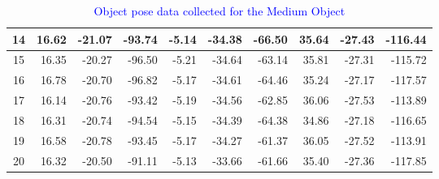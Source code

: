 \begin{table}[]
{\begin{tabular}{|c|r|r|r|r|r|r|r|r|r|}
14      & 16.62                       & -21.07                      & -93.74                                 & -5.14                       & -34.38                      & -66.50                                  & 35.64                       & -27.43                      & -116.44                                \\ \hline
15      & 16.35                       & -20.27                      & -96.50                                  & -5.21                       & -34.64                      & -63.14                                 & 35.81                       & -27.31                      & -115.72                                \\ \hline
16      & 16.78                       & -20.70                       & -96.82                                 & -5.17                       & -34.61                      & -64.46                                 & 35.24                       & -27.17                      & -117.57                                \\ \hline
17      & 16.14                       & -20.76                      & -93.42                                 & -5.19                       & -34.56                      & -62.85                                 & 36.06                       & -27.53                      & -113.89                                \\ \hline
18      & 16.31                       & -20.74                      & -94.54                                 & -5.15                       & -34.39                      & -64.38                                 & 34.86                       & -27.18                      & -116.65                                \\ \hline
19      & 16.58                       & -20.78                      & -93.45                                 & -5.17                       & -34.27                      & -61.37                                 & 36.05                       & -27.52                      & -113.91                                \\ \hline
20      & 16.32                       & -20.50                       & -91.11                                 & -5.13                       & -33.66                      & -61.66                                 & 35.40                        & -27.36                      & -117.85                                \\ \hline
\end{tabular}%
}
\caption{\textcolor{blue}{Object pose data collected for the Medium Object}}
\label{tab:medium-object}
\end{table}


